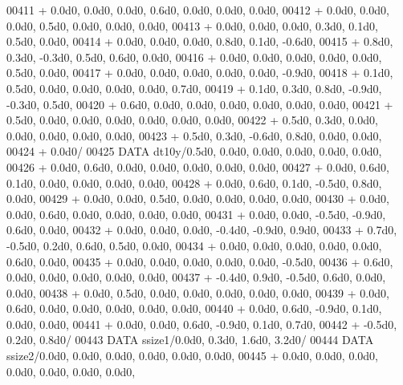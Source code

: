 \begin{DoxyCode}
00411      +                  0.0d0, 0.0d0, 0.0d0, 0.6d0, 0.0d0, 0.0d0, 0.0d0,
00412      +                  0.0d0, 0.0d0, 0.0d0, 0.5d0, 0.0d0, 0.0d0, 0.0d0,
00413      +                  0.0d0, 0.0d0, 0.0d0, 0.3d0, 0.1d0, 0.5d0, 0.0d0,
00414      +                  0.0d0, 0.0d0, 0.0d0, 0.8d0, 0.1d0, -0.6d0,
00415      +                  0.8d0, 0.3d0, -0.3d0, 0.5d0, 0.6d0, 0.0d0,
00416      +                  0.0d0, 0.0d0, 0.0d0, 0.0d0, 0.0d0, 0.5d0, 0.0d0,
00417      +                  0.0d0, 0.0d0, 0.0d0, 0.0d0, 0.0d0, -0.9d0,
00418      +                  0.1d0, 0.5d0, 0.0d0, 0.0d0, 0.0d0, 0.0d0, 0.7d0,
00419      +                  0.1d0, 0.3d0, 0.8d0, -0.9d0, -0.3d0, 0.5d0,
00420      +                  0.6d0, 0.0d0, 0.0d0, 0.0d0, 0.0d0, 0.0d0, 0.0d0,
00421      +                  0.5d0, 0.0d0, 0.0d0, 0.0d0, 0.0d0, 0.0d0, 0.0d0,
00422      +                  0.5d0, 0.3d0, 0.0d0, 0.0d0, 0.0d0, 0.0d0, 0.0d0,
00423      +                  0.5d0, 0.3d0, -0.6d0, 0.8d0, 0.0d0, 0.0d0,
00424      +                  0.0d0/
00425       \textcolor{keyword}{DATA}              dt10y/0.5d0, 0.0d0, 0.0d0, 0.0d0, 0.0d0, 0.0d0,
00426      +                  0.0d0, 0.6d0, 0.0d0, 0.0d0, 0.0d0, 0.0d0, 0.0d0,
00427      +                  0.0d0, 0.6d0, 0.1d0, 0.0d0, 0.0d0, 0.0d0, 0.0d0,
00428      +                  0.0d0, 0.6d0, 0.1d0, -0.5d0, 0.8d0, 0.0d0,
00429      +                  0.0d0, 0.0d0, 0.5d0, 0.0d0, 0.0d0, 0.0d0, 0.0d0,
00430      +                  0.0d0, 0.0d0, 0.6d0, 0.0d0, 0.0d0, 0.0d0, 0.0d0,
00431      +                  0.0d0, 0.0d0, -0.5d0, -0.9d0, 0.6d0, 0.0d0,
00432      +                  0.0d0, 0.0d0, 0.0d0, -0.4d0, -0.9d0, 0.9d0,
00433      +                  0.7d0, -0.5d0, 0.2d0, 0.6d0, 0.5d0, 0.0d0,
00434      +                  0.0d0, 0.0d0, 0.0d0, 0.0d0, 0.0d0, 0.6d0, 0.0d0,
00435      +                  0.0d0, 0.0d0, 0.0d0, 0.0d0, 0.0d0, -0.5d0,
00436      +                  0.6d0, 0.0d0, 0.0d0, 0.0d0, 0.0d0, 0.0d0,
00437      +                  -0.4d0, 0.9d0, -0.5d0, 0.6d0, 0.0d0, 0.0d0,
00438      +                  0.0d0, 0.5d0, 0.0d0, 0.0d0, 0.0d0, 0.0d0, 0.0d0,
00439      +                  0.0d0, 0.6d0, 0.0d0, 0.0d0, 0.0d0, 0.0d0, 0.0d0,
00440      +                  0.0d0, 0.6d0, -0.9d0, 0.1d0, 0.0d0, 0.0d0,
00441      +                  0.0d0, 0.0d0, 0.6d0, -0.9d0, 0.1d0, 0.7d0,
00442      +                  -0.5d0, 0.2d0, 0.8d0/
00443       \textcolor{keyword}{DATA}              ssize1/0.0d0, 0.3d0, 1.6d0, 3.2d0/
00444       \textcolor{keyword}{DATA}              ssize2/0.0d0, 0.0d0, 0.0d0, 0.0d0, 0.0d0, 0.0d0,
00445      +                  0.0d0, 0.0d0, 0.0d0, 0.0d0, 0.0d0, 0.0d0, 0.0d0,

\end{DoxyCode}
